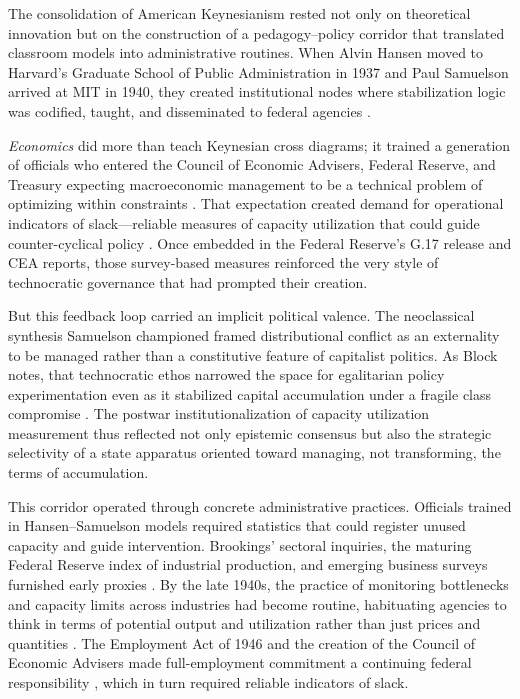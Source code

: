 \documentclass[11pt]{article}
\begin{document}
The consolidation of American Keynesianism rested not only on theoretical innovation but on the construction of a pedagogy--policy corridor that translated classroom models into administrative routines. When Alvin Hansen moved to Harvard's Graduate School of Public Administration in 1937 and Paul Samuelson arrived at MIT in 1940, they created institutional nodes where stabilization logic was codified, taught, and disseminated to federal agencies \citep{barber1987,backhouse2015}. 

\citet{samuelson1948} \emph{Economics} did more than teach Keynesian cross diagrams; it trained a generation of officials who entered the Council of Economic Advisers, Federal Reserve, and Treasury expecting macroeconomic management to be a technical problem of optimizing within constraints \citep{pearcehoover1995}. That expectation created demand for operational indicators of slack---reliable measures of capacity utilization that could guide counter-cyclical policy \citep{musgrave1976}. Once embedded in the Federal Reserve's G.17 release and CEA reports, those survey-based measures reinforced the very style of technocratic governance that had prompted their creation. 

But this feedback loop carried an implicit political valence. The neoclassical synthesis Samuelson championed \citep{samuelson1947,samuelson1948} framed distributional conflict as an externality to be managed rather than a constitutive feature of capitalist politics. As Block notes, that technocratic ethos narrowed the space for egalitarian policy experimentation even as it stabilized capital accumulation under a fragile class compromise \citep{block2008,jessop2002}. The postwar institutionalization of capacity utilization measurement thus reflected not only epistemic consensus but also the strategic selectivity of a state apparatus oriented toward managing, not transforming, the terms of accumulation.

This corridor operated through concrete administrative practices. Officials trained in Hansen--Samuelson models required statistics that could register unused capacity and guide intervention. Brookings' sectoral inquiries, the maturing Federal Reserve index of industrial production, and emerging business surveys furnished early proxies \citep{barber1987}. By the late 1940s, the practice of monitoring bottlenecks and capacity limits across industries had become routine, habituating agencies to think in terms of potential output and utilization rather than just prices and quantities \citep{bogfrs1945}. The Employment Act of 1946 and the creation of the Council of Economic Advisers made full-employment commitment a continuing federal responsibility \citep{bailey1950}, which in turn required reliable indicators of slack. 
\end{document}
